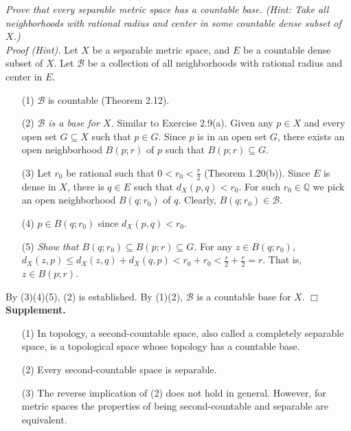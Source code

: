 \documentclass{article}
\begin{document}
\emph{Prove that every separable metric space has a countable base.
(Hint: Take all neighborhoods with rational radius and center
in some countable dense subset of $X$.)} \\

\emph{Proof (Hint).}
Let $X$ be a separable metric space,
and $E$ be a countable dense subset of $X$.
Let $\mathscr{B}$ be a collection of
all neighborhoods with rational radius and center in $E$.
\begin{enumerate}
\item[(1)]
$\mathscr{B}$ is countable (Theorem 2.12).
\item[(2)]
\emph{$\mathscr{B}$ is a base for $X$.}
Similar to Exercise 2.9(a).
Given any $p \in X$ and every open set $G \subseteq X$ such that
$p \in G$.
Since $p$ is in an open set $G$,
there exists an open neighborhood $B(p;r)$ of $p$ such that $B(p;r) \subseteq G$.
\item[(3)]
Let $r_0$ be rational such that $0 < r_0 < \frac{r}{2}$ (Theorem 1.20(b)).
Since $E$ is dense in $X$, there is $q \in E$ such that $d_X(p,q) < r_0$.
For such $r_0 \in \mathbb{Q}$ we pick an open neighborhood $B(q;r_0)$ of $q$.
Clearly, $B(q;r_0) \in \mathscr{B}$.
\item[(4)]
$p \in B(q;r_0)$ since $d_X(p,q) < r_0$.
\item[(5)]
\emph{Show that $B(q;r_0) \subseteq B(p;r) \subseteq G$.}
For any $z \in B(q;r_0)$, $d_X(z,p) \leq d_X(z,q)+ d_X(q,p) < r_0 + r_0
< \frac{r}{2} + \frac{r}{2} = r$.
That is, $z \in B(p;r)$.
\end{enumerate}
By (3)(4)(5), (2) is established.
By (1)(2), $\mathscr{B}$ is a countable base for $X$.
$\Box$ \\

\textbf{Supplement.}
\begin{enumerate}
\item[(1)]
In topology, a second-countable space, also called a completely separable space,
is a topological space whose topology has a countable base.
\item[(2)]
Every second-countable space is separable.
\item[(3)]
The reverse implication of (2) does not hold in general.
However, for metric spaces
the properties of being second-countable and separable are equivalent. \\\\
\end{enumerate}



\end{document}
